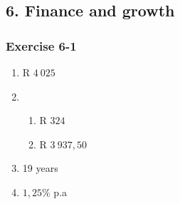 \subsection* {6. Finance and growth}
\begin{multicols}{3}
\subsubsection*{Exercise 6-1} %
    \begin{enumerate}[noitemsep, label=\textbf{\arabic*}.]
	\item R $4~ 025$%

	\item %
	\begin{enumerate}[noitemsep, label=\textbf{(\alph*)} ]
	    \item R $324$%

	    \item R $3~ 937,50$ %
	\end{enumerate}

	\item 19 years %

	\item $1,25\%$ p.a%
    \end{enumerate}


\end{multicols}
